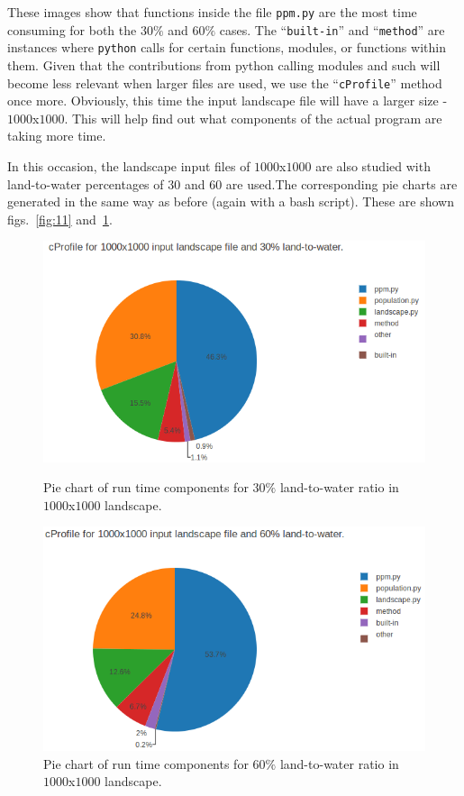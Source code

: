 \documentclass[12pt,a4paper]{article}
\begin{document}
These images show that functions inside the file \texttt{ppm.py} are the 
most time consuming for both the $30\%$ and $60\%$ cases. The 
``\texttt{built-in}'' and ``\texttt{method}'' are instances where 
\texttt{python} 
calls for certain functions, modules, or functions within them. Given that 
the contributions from python calling modules and such will become less 
relevant when larger files are used, we use the ``\texttt{cProfile}'' method 
once more. Obviously, this time the input landscape file will have a larger 
size - $1000$x$1000$. This will help  find out what components of the actual 
program are taking more time.

In this occasion, the landscape input files of $1000$x$1000$ are also 
studied with land-to-water percentages of $30$ and $60$ are used.The 
corresponding pie charts are generated in the same way as before (again with 
a bash script). These are shown figs.~\ref{fig:11} and~\ref{fig:12}.

\begin{figure}[ht]
\begin{minipage}[b]{0.45\linewidth}
\flushleft
\includegraphics[width=1.1\textwidth]{img/cProfile_30_1000.png}
\caption{Pie chart of run time components for $30\%$ 
land-to-water ratio in $1000$x$1000$ landscape.}
\label{fig:11}
\end{minipage}
\hspace{0.5cm}
\begin{minipage}[b]{0.45\linewidth}
\flushleft
\includegraphics[width=1.1\textwidth]{img/cProfile_60_1000.png}
\caption{Pie chart of run time components for $60\%$ 
land-to-water ratio in $1000$x$1000$ landscape.}
\label{fig:12}
\end{minipage}
\end{figure}
\end{document}
